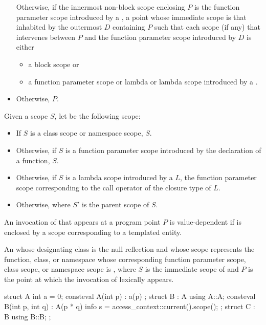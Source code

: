 \begin{itemdescr}
\begin{itemize}
    Otherwise, if the innermost non-block scope enclosing $P$
    is the function parameter scope
    introduced by a ,
    a point whose immediate scope is that inhabited
    by the outermost  $D$
    containing $P$ such that each scope (if any) that intervenes between $P$
    and the function parameter scope introduced by $D$ is either
    \begin{itemize}
    \item
      a block scope or
    \item
      a function parameter scope or lambda or lambda scope
      introduced by a .
    \end{itemize}
  \item
    Otherwise, $P$.
\end{itemize}

\pnum
Given a scope $S$,
let  be the following scope:
\begin{itemize}
\item
  If $S$ is a class scope or namespace scope,
  $S$.
\item
  Otherwise, if $S$ is a function parameter scope
  introduced by the declaration of a function,
  $S$.
\item
  Otherwise, if $S$ is a lambda scope
  introduced by a  $L$,
  the function parameter scope
  corresponding to the call operator of the closure type of $L$.
\item
  Otherwise, 
  where $S'$ is the parent scope of $S$.
\end{itemize}

\pnum
An invocation of  that appears at a program point $P$
is value-dependent
if  is enclosed by a scope
corresponding to a templated entity.

\pnum
\returns
An  whose designating class is the null reflection
and whose scope represents the function, class, or namespace
whose corresponding function parameter scope, class scope, or namespace scope
is ,
where $S$ is the immediate scope of 
and $P$ is the point at which the invocation of  lexically appears.
\begin{example}
\begin{codeblock}
struct A {
  int a = 0;
  consteval A(int p) : a(p) {}
};
struct B : A {
  using A::A;
  consteval B(int p, int q) : A(p * q) {}
  info s = access_context::current().scope();
};
struct C : B { using B::B; };


\end{codeblock}
\end{example}
\end{itemdescr}

